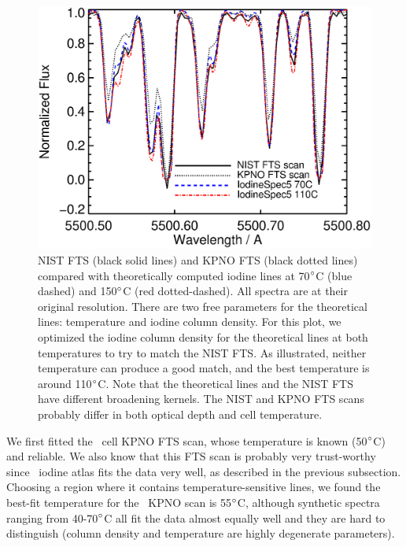 \begin{figure}
\centering
\includegraphics[scale=0.5]{het/HET_NIST_temp.eps}
\caption{NIST FTS (black solid lines) and KPNO FTS (black dotted
lines) compared with theoretically computed iodine lines at
70$^{\circ}$C (blue dashed) and 150$^{\circ}$C (red dotted-dashed). All
spectra are at their original resolution. There are two free
parameters for the theoretical lines: temperature and iodine column
density. For this plot, we optimized the iodine column density for the
theoretical lines at both temperatures to try to match the NIST FTS. As
illustrated, neither temperature can produce a good match, and the
best temperature is around 110$^{\circ}$C. Note that the
theoretical lines and the NIST FTS have different broadening
kernels. The NIST and KPNO FTS scans probably differ in both optical
depth and cell temperature.
\label{het:fig:nisteyeball}}
\end{figure}

We first fitted the \keck\ cell KPNO FTS scan, whose temperature is
known (50$^{\circ}$C) and reliable. We also know that this FTS scan is
probably very trust-worthy since \keck\ iodine atlas fits the data
very well, as described in the previous subsection. Choosing a region
where it contains temperature-sensitive lines, we found the best-fit
temperature for the \keck\ KPNO scan is 55$^{\circ}$C, although
synthetic spectra ranging from 40-70$^{\circ}$C all fit the data
almost equally well and they are hard to distinguish (column density
and temperature are highly degenerate parameters). 

